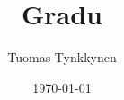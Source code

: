 \documentclass[finnish]{tktltiki2/tktltiki2}
\title{Gradu}
\author{Tuomas Tynkkynen}
\date{\today}
\theoremstyle{definition}
\theoremstyle{remark}
\begin{document}


\frontmatter      %
\maketitle        %
\makeabstract     %

\tableofcontents  %


\mainmatter


%
%
% 
%

% 
% 



\end{document}
